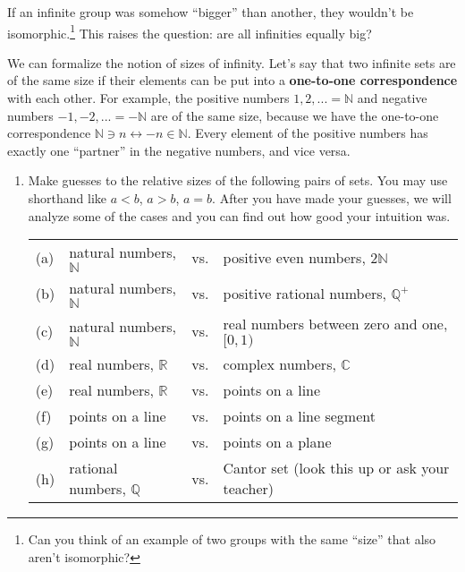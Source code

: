 \documentclass[../gatm.tex]{subfiles}
\begin{document}
If an infinite group was somehow ``bigger'' than another, they wouldn't be isomorphic.\footnote{Can you think of an example of two groups with the same ``size'' that also aren't isomorphic?} This raises the question: are all infinities equally big?

We can formalize the notion of sizes of infinity. Let's say that two infinite sets are of the same size if their elements can be put into a \textbf{one-to-one correspondence} with each other. For example, the positive numbers ${1,2,...}=\mathbb{N}$ and negative numbers ${-1,-2,...}=-\mathbb{N}$ are of the same size, because we have the one-to-one correspondence $\mathbb{N} \ni n\leftrightarrow -n \in \mathbb{N}$. Every element of the positive numbers has exactly one ``partner'' in the negative numbers, and vice versa.

\begin{enumerate}
\setcounter{enumi}{\value{inf_problem_i}}
\item Make guesses to the relative sizes of the following pairs of sets. You may use shorthand like $a < b$, $a > b$, $a = b$. After you have made your guesses, we will analyze some of the cases and you can find out how good your intuition was.

\begin{tabular}{llll} %
(a) & natural numbers, $\mathbb{N}$ & vs. & positive even numbers, $2\mathbb{N}$ \\
(b) & natural numbers, $\mathbb{N}$ & vs. & positive rational numbers, $\mathbb{Q}^+$ \\
(c) & natural numbers, $\mathbb{N}$ & vs. & real numbers between zero and one, $[0,1)$ \\
(d) & real numbers, $\mathbb{R}$ & vs. & complex numbers, $\mathbb{C}$ \\
(e) & real numbers, $\mathbb{R}$ & vs. & points on a line \\
(f) & points on a line & vs. & points on a line segment \\
(g) & points on a line & vs. & points on a plane \\
(h) & rational numbers, $\mathbb{Q}$ & vs. & Cantor set (look this up or ask your teacher) \\ %
\end{tabular}

\setcounter{inf_problem_i}{\value{enumi}}
\end{enumerate}
\end{document}

